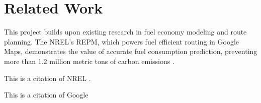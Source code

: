 \documentclass[letterpaper]{article}
\begin{document}
\section{Related Work}

This project builds upon existing research in fuel economy modeling and route planning. 
The NREL's REPM, which powers fuel efficient routing in Google Maps, demonstrates the value of accurate fuel consumption prediction, preventing more than 1.2 million metric tons of carbon emissions \cite{google_2023_environmental_report}.

This is a citation of NREL \cite{nrel_routee}.

This is a citation of Google \cite{google_2023_environmental_report}


 

\end{document}
